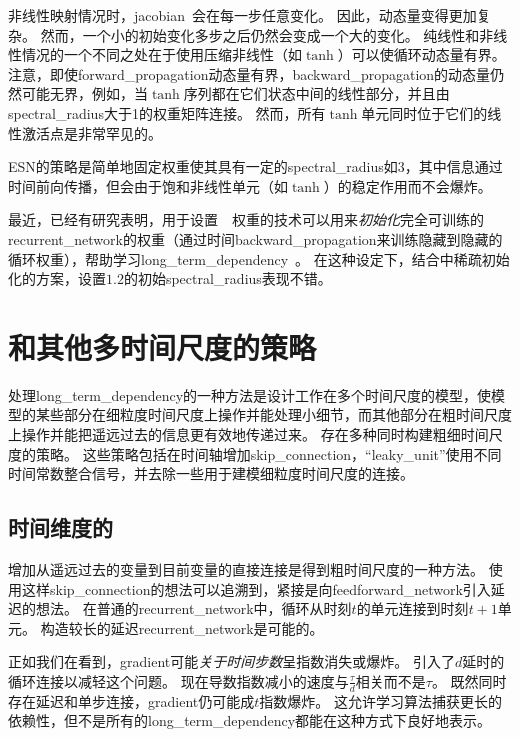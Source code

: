 非线性映射情况时，\gls{jacobian}~会在每一步任意变化。
因此，动态量变得更加复杂。
然而，一个小的初始变化多步之后仍然会变成一个大的变化。
纯线性和非线性情况的一个不同之处在于使用压缩非线性（如$\tanh$）可以使循环动态量有界。
注意，即使\gls{forward_propagation}动态量有界，\gls{backward_propagation}的动态量仍然可能无界，例如，当$\tanh$序列都在它们状态中间的线性部分，并且由\gls{spectral_radius}大于1的权重矩阵连接。
然而，所有$\tanh$单元同时位于它们的线性激活点是非常罕见的。


\gls{ESN}的策略是简单地固定权重使其具有一定的\gls{spectral_radius}如3，其中信息通过时间前向传播，但会由于饱和非线性单元（如$\tanh$）的稳定作用而不会爆炸。

最近，已经有研究表明，用于设置~~权重的技术可以用来\emph{初始化}完全可训练的\gls{recurrent_network}的权重（通过时间\gls{backward_propagation}来训练隐藏到隐藏的循环权重），帮助学习\gls{long_term_dependency}~\citep{Sutskever-2012,Sutskever-et-al-2013}。
在这种设定下，结合中稀疏初始化的方案，设置$1.2$的初始\gls{spectral_radius}表现不错。

\section{和其他多时间尺度的策略}
\label{sec:leaky_units_and_other_strategiesfor_multiple_time_scales}
处理\gls{long_term_dependency}的一种方法是设计工作在多个时间尺度的模型，使模型的某些部分在细粒度时间尺度上操作并能处理小细节，而其他部分在粗时间尺度上操作并能把遥远过去的信息更有效地传递过来。
存在多种同时构建粗细时间尺度的策略。
这些策略包括在时间轴增加\gls{skip_connection}，``\gls{leaky_unit}''使用不同时间常数整合信号，并去除一些用于建模细粒度时间尺度的连接。

\subsection{时间维度的}
\label{sec:adding_skip_connections_through_time}
增加从遥远过去的变量到目前变量的直接连接是得到粗时间尺度的一种方法。
使用这样\gls{skip_connection}的想法可以追溯到\cite{Lin-et-al-1996}，紧接是向\gls{feedforward_network}引入延迟的想法\citep{Lang-Hinton-1988}。
在普通的\gls{recurrent_network}中，循环从时刻$t$的单元连接到时刻$t+1$单元。
构造较长的延迟\gls{recurrent_network}是可能的\citep{Bengio-1991}。

正如我们在看到，\gls{gradient}可能\emph{关于时间步数}呈指数消失或爆炸。
\citep{Lin-et-al-1996}引入了$d$延时的循环连接以减轻这个问题。
现在导数指数减小的速度与$\frac{\tau}{d}$相关而不是$\tau$。
既然同时存在延迟和单步连接，\gls{gradient}仍可能成$t$指数爆炸。
这允许学习算法捕获更长的依赖性，但不是所有的\gls{long_term_dependency}都能在这种方式下良好地表示。

